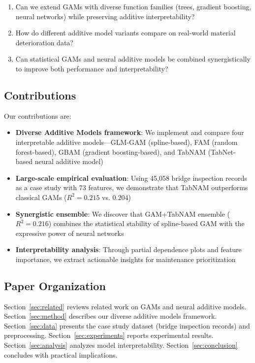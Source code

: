 \documentclass[twocolumn]{article}
\begin{document}
\begin{enumerate}
\item Can we extend GAMs with diverse function families (trees, gradient boosting, neural networks) while preserving additive interpretability?
\item How do different additive model variants compare on real-world material deterioration data?
\item Can statistical GAMs and neural additive models be combined synergistically to improve both performance and interpretability?
\end{enumerate}

\subsection{Contributions}

Our contributions are:

\begin{itemize}
\item \textbf{Diverse Additive Models framework}: We implement and compare four interpretable additive models—GLM-GAM (spline-based), FAM (random forest-based), GBAM (gradient boosting-based), and TabNAM (TabNet-based neural additive model)
\item \textbf{Large-scale empirical evaluation}: Using 45,058 bridge inspection records as a case study with 73 features, we demonstrate that TabNAM outperforms classical GAMs ($R^2=0.215$ vs. $0.204$)
\item \textbf{Synergistic ensemble}: We discover that GAM+TabNAM ensemble ($R^2=0.216$) combines the statistical stability of spline-based GAM with the expressive power of neural networks
\item \textbf{Interpretability analysis}: Through partial dependence plots and feature importance, we extract actionable insights for maintenance prioritization
\end{itemize}

\subsection{Paper Organization}

Section~\ref{sec:related} reviews related work on GAMs and neural additive models. Section~\ref{sec:method} describes our diverse additive models framework. Section~\ref{sec:data} presents the case study dataset (bridge inspection records) and preprocessing. Section~\ref{sec:experiments} reports experimental results. Section~\ref{sec:analysis} analyzes model interpretability. Section~\ref{sec:conclusion} concludes with practical implications.
\end{document}
